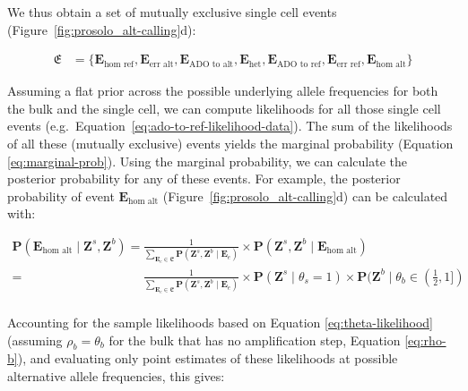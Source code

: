 \documentclass[12pt,inline]{wlscirep}
\newcommand{\Prob}{{\mathbf{P}}}
\begin{document}
We thus obtain a set of mutually exclusive single cell events (Figure~\ref{fig:prosolo_alt-calling}d):

\begin{equation}
  \label{eq:event-set}
  \begin{split}
    \mathfrak{E} &= \{ \boldsymbol{E}_{\text{hom ref}}, \boldsymbol{E}_{\text{err alt}}, \boldsymbol{E}_{\text{ADO to alt}}, \boldsymbol{E}_{\text{het}}, \boldsymbol{E}_{\text{ADO to ref}}, \boldsymbol{E}_{\text{err ref}}, \boldsymbol{E}_{\text{hom alt}} \}
  \end{split}
\end{equation}

Assuming a flat prior across the possible underlying allele frequencies for both the bulk and the single cell, we can compute likelihoods for all those single cell events (e.g.~Equation~\ref{eq:ado-to-ref-likelihood-data}).
The sum of the likelihoods of all these (mutually exclusive) events yields the marginal probability (Equation \ref{eq:marginal-prob}).
Using the marginal probability, we can calculate the posterior probability for any of these events.
For example, the posterior probability of event $\boldsymbol{E}_{\text{hom alt}}$ (Figure~\ref{fig:prosolo_alt-calling}d) can be calculated with:

\begin{equation}
 \label{eq:hom-alt-posterior-samples}
 \begin{split}
  \Prob(\boldsymbol{E}_{\text{hom alt}} \mid \boldsymbol{Z}^s,\boldsymbol{Z}^b)
    =~&\frac{1}{\sum_{\boldsymbol{E}_e \in \mathfrak{E}}{\Prob(\boldsymbol{Z}^s,\boldsymbol{Z}^b \mid \boldsymbol{E}_e )}} \times
      \Prob(\boldsymbol{Z}^s,\boldsymbol{Z}^b \mid \boldsymbol{E}_{\text{hom alt}}) \\
    =~&\frac{1}{\sum_{\boldsymbol{E}_e \in \mathfrak{E}}{\Prob(\boldsymbol{Z}^s,\boldsymbol{Z}^b \mid \boldsymbol{E}_e )}} \times
      \Prob(\boldsymbol{Z}^s \mid \theta_s = 1) \times \Prob(\boldsymbol{Z}^b \mid \theta_b \in (\frac12,1])\\
  \end{split}    
\end{equation}

Accounting for the sample likelihoods based on Equation \ref{eq:theta-likelihood} (assuming $\rho_b = \theta_b$ for the bulk that has no amplification step, Equation \ref{eq:rho-b}), and evaluating only point estimates of these likelihoods at possible alternative allele frequencies, this gives:
\end{document}
